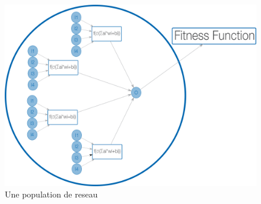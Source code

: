 \documentclass[10pt,a4paper,oneside]{article}
\begin{document}
\vspace{0.8cm}

\begin{figure}[!ht]
\centering
\includegraphics[scale=0.5]{./images/PNG/Population.png}
\caption{Une population de reseau}
\label{pop}
\end{figure}

\vspace{0.8cm}
\end{document}
